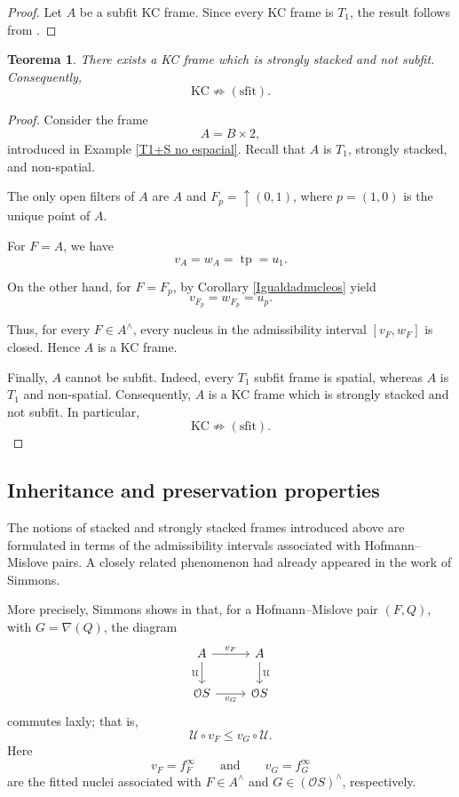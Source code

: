 \documentclass[11pt]{amsart}
\theoremstyle{plain}
\newtheorem{thm}{Teorema}[section]
\theoremstyle{definition}
\begin{document}
\begin{proof}
Let $A$ be a subfit KC frame. Since every KC frame is $T_1$, the
result follows from \cite[Proposition~2.5.3]{picado2021separation}.
\end{proof}

\begin{thm}\label{KCnosfit}
There exists a KC frame which is strongly stacked and not subfit.
Consequently,
\[
    \mathrm{KC}\not\Rightarrow\mathrm{(sfit)}.
\]
\end{thm}

\begin{proof}
Consider the frame
\[
    A=B\times 2,
\]
introduced in Example \ref{T1+S no espacial}. Recall that $A$ is $T_1$, strongly stacked,
and non-spatial.

The only open filters of $A$ are $A$ and $F_p=\uparrow(0,1)$, where $p=(1,0)$ is the unique point of $A$.

For $F=A$, we have
\[
    v_A=w_A=\operatorname{tp}=u_1.
\]

On the other hand, for $F=F_p$, by Corollary \ref{Igualdadnucleos} yield
\[
    v_{F_p}=w_{F_p}=u_p.
\]

Thus, for every $F\in A^\wedge$, every nucleus in the admissibility
interval $[v_F,w_F]$ is closed. Hence $A$ is a KC frame.

Finally, $A$ cannot be subfit. Indeed, every $T_1$ subfit frame is
spatial, whereas $A$ is $T_1$ and non-spatial. Consequently, $A$ is
a KC frame which is strongly stacked and not subfit. In particular,
\[
    \mathrm{KC}\not\Rightarrow\mathrm{(sfit)}.
\]
\end{proof}

\subsection{Inheritance and preservation properties}
The notions of stacked and strongly stacked frames introduced above are
formulated in terms of the admissibility intervals associated with
Hofmann--Mislove pairs. A closely related phenomenon had already appeared in the
work of Simmons.

More precisely, Simmons shows in \cite[Lemma 8.9 and Corollary 8.10]{simmons2004vietoris}  that, for a Hofmann--Mislove pair
\((F,Q)\), with \(G=\nabla(Q)\), the diagram
\begin{equation}\label{Qlaxo}
\begin{tikzcd}
    A \arrow[r,"v_F"] \arrow[d,"\mathcal{U}"'] &
    A \arrow[d,"\mathcal{U}"] \\
    \mathcal{O}S \arrow[r,"v_G"'] &
    \mathcal{O}S
\end{tikzcd}
\end{equation}
commutes laxly; that is,
\[
    \mathcal{U}\circ v_F\leq v_G\circ\mathcal{U}.
\]
Here
\[
    v_F=f_F^\infty
    \qquad\text{and}\qquad
    v_G=f_G^\infty
\]
are the fitted nuclei associated with \(F\in A^\wedge\) and
\(G\in(\mathcal{O}S)^\wedge\), respectively.
\end{document}
